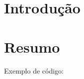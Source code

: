 









\textual


\chapter[Introdução]{Introdução}

\lipsum[11-12]

\chapter{Resumo}

Exemplo de código:

